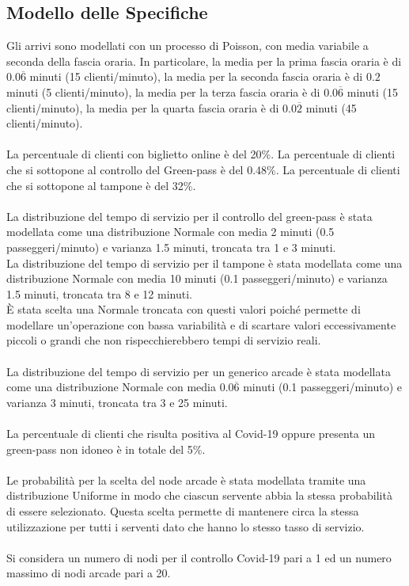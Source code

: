 \documentclass{article}
\begin{document}
\subsection{Modello delle Specifiche}
Gli arrivi sono modellati con un processo di Poisson, con media variabile a seconda della fascia oraria. In particolare, la media per la prima fascia oraria è di $0.0\overline{6}$  minuti (15 clienti/minuto), la media per la seconda fascia oraria è di $0.2$  minuti (5 clienti/minuto), la media per la terza fascia oraria è di $0.0\overline{6}$   minuti (15 clienti/minuto), la media per la quarta fascia oraria è di $0.0\overline{2}$  minuti (45 clienti/minuto).
\\ \\
La percentuale di clienti con biglietto online è del 20\%. La percentuale di clienti che si sottopone al controllo del  Green-pass è del 0.48\%. La percentuale di clienti che si sottopone al tampone è del 32\%.
\\ \\
La distribuzione del tempo di servizio per il controllo del green-pass è stata modellata
come una distribuzione Normale con media 2 minuti (0.5 passeggeri/minuto) e varianza 1.5 minuti, troncata tra 1 e 3 minuti. 
\\
La distribuzione del tempo di servizio per il tampone è stata modellata
come una distribuzione Normale con media 10 minuti (0.1 passeggeri/minuto) e varianza 1.5 minuti, troncata tra 8 e 12 minuti. 
\\
È stata scelta una Normale troncata con questi valori poiché permette di modellare un'operazione con bassa variabilità e di scartare valori eccessivamente piccoli o grandi che non rispecchierebbero tempi di servizio reali.
\\ \\
La distribuzione del tempo di servizio per un generico arcade è stata modellata
come una distribuzione Normale con media $0.0\overline{6}$ minuti (0.1 passeggeri/minuto) e varianza 3 minuti, troncata tra 3 e 25 minuti.
\\ \\
La percentuale di clienti che risulta positiva al Covid-19 oppure presenta un green-pass non idoneo è in totale del 5\%.
\\ \\
Le probabilità per la scelta del node arcade è stata modellata tramite una distribuzione Uniforme in modo che ciascun servente abbia la stessa probabilità di essere selezionato. Questa scelta permette di mantenere circa la stessa utilizzazione per tutti i serventi dato che hanno lo stesso tasso di servizio.
\\ \\
Si considera un numero di nodi per il controllo Covid-19 pari a 1 ed un numero massimo di nodi arcade pari a 20.
\end{document}
